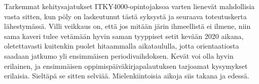 \documentclass[utf8]{gradu3}
\begin{document}
Tarkemmat kehitysajatukset ITKY4000-opintojaksoa varten lienevät mahdollisia
vasta sitten, kun pöly on laskeutunut tästä syksystä ja seuraava toteutuskerta
lähestymässä. Villi veikkaus on, että jos mitään järin ihmeellistä ei ilmene,
niin sama kaveri tulee vetämään hyvin saman tyyppiset setit kevään 2020 aikana,
oletettavasti kuitenkin puolet hitaammalla aikataululla, jotta orientaatiosta
saadaan jatkumo yli ensimmäisen periodivaihdoksen. Kevät voi olla hyvin
erilainen, ja ensimmäisen oppimispäiväkirjapalautuksen tarjoamat kysymykset
erilaisia. Sieltäpä se sitten selviää. Mielenkiintoisia aikoja siis takana ja
edessä.

\printbibliography
\end{document}
